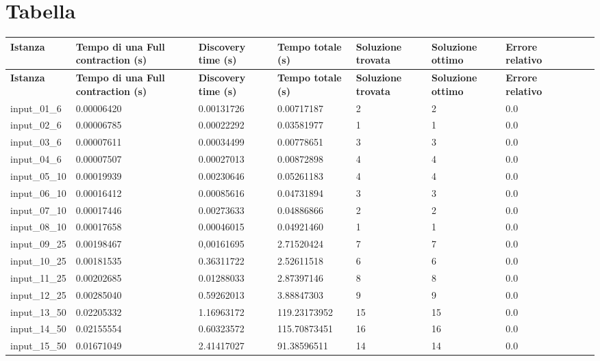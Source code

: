 \section{Tabella\label{sec:tabella}}

\footnotesize
\begin{tabularx}{\textwidth}{*{10}{Y}}
    \toprule
    \textbf{Istanza} & \textbf{Tempo di una Full contraction (s)} & \textbf{Discovery time (s)} & \textbf{Tempo totale (s)} & \textbf{Soluzione trovata} & \textbf{Soluzione ottimo} & \textbf{Errore relativo}\\
    \endfirsthead
    \toprule
    \textbf{Istanza} & \textbf{Tempo di una Full contraction (s)} & \textbf{Discovery time (s)} & \textbf{Tempo totale (s)} & \textbf{Soluzione trovata} & \textbf{Soluzione ottimo} & \textbf{Errore relativo}\\
    \endhead
    \midrule
    input\_01\_6	&	0.00006420	&	0.00131726	&	0.00717187	&	2	&	2	&	0.0	\\\midrule
	input\_02\_6	&	0.00006785	&	0.00022292	&	0.03581977	&	1	&	1	&	0.0	\\\midrule
	input\_03\_6	&	0.00007611	&	0.00034499	&	0.00778651	&	3	&	3	&	0.0	\\\midrule
	input\_04\_6	&	0.00007507	&	0.00027013	&	0.00872898	&	4	&	4	&	0.0	\\\midrule
	input\_05\_10	&	0.00019939	&	0.00230646	&	0.05261183	&	4	&	4	&	0.0	\\\midrule
	input\_06\_10	&	0.00016412	&	0.00085616	&	0.04731894	&	3	&	3	&	0.0	\\\midrule
	input\_07\_10	&	0.00017446	&	0.00273633	&	0.04886866	&	2	&	2	&	0.0	\\\midrule
	input\_08\_10	&	0.00017658	&	0.00046015	&	0.04921460	&	1	&	1	&	0.0	\\\midrule
	input\_09\_25	&	0.00198467	&	0,00161695	&	2.71520424	&	7	&	7	&	0.0	\\\midrule
	input\_10\_25	&	0.00181535	&	0.36311722	&	2.52611518	&	6	&	6	&	0.0	\\\midrule
	input\_11\_25	&	0.00202685	&	0.01288033	&	2.87397146	&	8	&	8	&	0.0	\\\midrule
	input\_12\_25	&	0.00285040	&	0.59262013	&	3.88847303	&	9	&	9	&	0.0	\\\midrule
	input\_13\_50	&	0.02205332	&	1.16963172	&	119.23173952	&	15	&	15	 & 0.0	\\\midrule
	input\_14\_50	&	0.02155554	&	0.60323572	&	115.70873451	&	16	&	16	 & 0.0	\\\midrule
	input\_15\_50	&	0.01671049	&	2.41417027	&	91.38596511		&	14	&	14	 & 0.0	\\\midrule

\end{tabularx}
